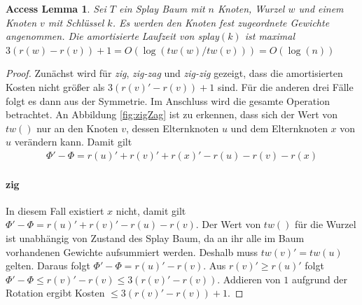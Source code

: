 \documentclass[a4paper,12pt]{article}
\begin{document}
\newtheorem{Lemma1}{Access Lemma}[section] \label{lemmaSplay}
\begin{Lemma1}Sei $T$ ein Splay Baum mit $n$ Knoten, Wurzel $w$ und einem Knoten $v$ mit Schlüssel $k$. Es werden den Knoten fest zugeordnete Gewichte angenommen. Die amortisierte Laufzeit von \textit{splay}$\left(k\right)$ ist maximal $3 \left(r\left(w\right) - r\left(v\right)\right) + 1 = O\left(\log\left(\mathit{tw}\left(w\right) / \mathit{tw}\left(v\right)\right) \right) = O\left(\log\left(n\right)\right)$ \\
	
\end{Lemma1}
\begin{proof}
	Zunächst wird für \textit{zig}, \textit{zig-zag} und \textit{zig-zig} gezeigt, dass die amortisierten Kosten nicht größer als $3 \left(r\left(v\right)' - r\left(v\right)\right) + 1$ sind. Für die anderen drei Fälle folgt es dann aus der Symmetrie. Im Anschluss wird die gesamte Operation  betrachtet. An Abbildung  \ref{fig:zigZag} ist zu erkennen, dass sich der Wert von $\mathit{tw}\left(\right)$ nur an den Knoten $v$, dessen Elternknoten $u$  und dem Elternknoten $x$ von $u$ verändern kann.  Damit gilt
	\begin{align*}
	\Phi' - \Phi  = r\left(u\right)' +r\left(v\right)' +r\left(x\right)' - r\left(u\right)- r\left(v\right)- r\left(x\right)
	\end{align*}
	
	
	\paragraph{zig} 
	In diesem Fall existiert $x$ nicht, damit gilt\\  {$ \Phi' - \Phi  = r\left(u\right)' +r\left(v\right)' - r\left(u\right)- r\left(v\right)$}. Der Wert von $\mathit{tw}\left(\right)$ für die Wurzel ist unabhängig von Zustand des Splay Baum, da an ihr alle im Baum vorhandenen Gewichte aufsummiert werden. Deshalb muss  $\mathit{tw}\left(v\right)' =  \mathit{tw}\left(u\right)$ gelten. Daraus folgt $ \Phi' - \Phi  = r\left(u\right)'- r\left(v\right)$. Aus $r\left(v\right)' \geq r\left(u\right)'$ folgt $ \Phi' - \Phi \leq  r\left(v\right)'- r\left(v\right) \leq 3\left(r\left(v\right)'- r\left(v\right)\right) $. Addieren von $1$ aufgrund der Rotation ergibt Kosten $\leq 3\left(r\left(v\right)'- r\left(v\right)\right) + 1$.

\end{proof}
\end{document}
